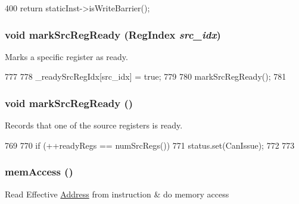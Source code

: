 \begin{DoxyCode}
400 { return staticInst->isWriteBarrier(); }
\end{DoxyCode}
\hypertarget{classInOrderDynInst_a20a741d6245dcbf24bb3bc167946e1ec}{
\subsubsection[{markSrcRegReady}]{\setlength{\rightskip}{0pt plus 5cm}void markSrcRegReady ({\bf RegIndex} {\em src\_\-idx})}}
\label{classInOrderDynInst_a20a741d6245dcbf24bb3bc167946e1ec}
Marks a specific register as ready. 


\begin{DoxyCode}
777     {
778         _readySrcRegIdx[src_idx] = true;
779 
780         markSrcRegReady();
781     }
\end{DoxyCode}
\hypertarget{classInOrderDynInst_acd6444fdff2557922a35895eccab2d0f}{
\subsubsection[{markSrcRegReady}]{\setlength{\rightskip}{0pt plus 5cm}void markSrcRegReady ()}}
\label{classInOrderDynInst_acd6444fdff2557922a35895eccab2d0f}
Records that one of the source registers is ready. 


\begin{DoxyCode}
769     {
770         if (++readyRegs == numSrcRegs()) {
771             status.set(CanIssue);
772         }
773     }
\end{DoxyCode}
\hypertarget{classInOrderDynInst_a59a68ea55d45f5f193a5f0396b79e036}{
\subsubsection[{memAccess}]{ memAccess ()}}
\label{classInOrderDynInst_a59a68ea55d45f5f193a5f0396b79e036}
Read Effective \hyperlink{classAddress}{Address} from instruction \& do memory access 


